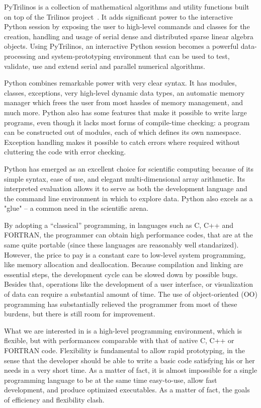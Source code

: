 \documentclass[10pt,relax]{SANDreport}
\begin{document}
PyTrilinos is a collection of mathematical algorithms and utility functions
built on top of the Trilinos project~\cite{Trilinos-home-page}.  It adds
significant power to the interactive Python session by exposing the user to
high-level commands and classes for the creation, handling and usage of serial
dense and distributed sparse linear algebra objects. Using PyTrilinos, an
interactive Python session becomes a powerful data-processing and
system-prototyping environment that can be used to test, validate, use and
extend serial and parallel numerical algorithms.

Python combines remarkable power with very clear syntax. It has modules,
  classes, exceptions, very high-level dynamic data types, an automatic
  memory manager which frees the user from most hassles of memory management,
  and much more. Python also has some features that make it possible to write
  large programs, even though it lacks most forms of compile-time checking: a
  program can be constructed out of modules, each of which defines its own
  namespace. Exception handling makes it possible to catch errors where
  required without cluttering the code with error checking. 

Python has emerged as an excellent choice for scientific computing because of
its simple syntax, ease of use, and elegant multi-dimensional array
arithmetic. Its interpreted evaluation allows it to serve as both the
development language and the command line environment in which to explore
data. Python also excels as a "glue" -- a common need in the scientific arena.

\smallskip

By adopting a ``classical'' programming, in languages such as C, C++ and
FORTRAN, the programmer can  obtain high performance codes, that are at the
same quite portable (since these languages are reasonably well standarized).
However, the price to pay is a constant care to low-level system programming,
  like memory allocation and deallocation. Because compilation and linking are
  essential steps, the development cycle can be slowed down by possible bugs.
  Besides that, operations like the development of a user interface, or
  visualization of data can require a substantial amount of time. The use of
  object-oriented (OO) programming has substantially relieved the programmer
  from most of these burdens, but there is still room for improvement.

What we are interested in is a high-level programming environment, which is
flexible, but with performances comparable with that of native C, C++ or
FORTRAN code. Flexibility is fundamental to allow rapid prototyping, in the
sense that the developer should be able to write a basic code satisfying his
or her needs in a very short time. 
As a matter of fact, 
it is almost impossible for a single
programming language to be at the same time easy-to-use, allow fast
development, and produce optimized executables. As a matter of fact, the
goals of efficiency and flexibility clash. 
\end{document}
